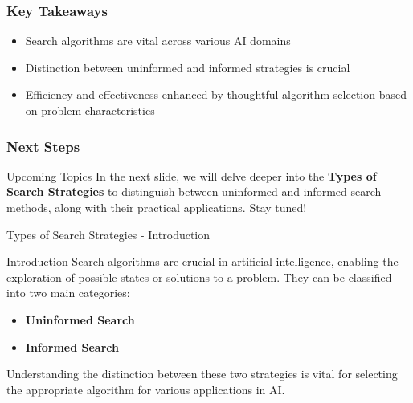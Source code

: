\documentclass[aspectratio=169]{beamer}
\begin{document}
\begin{frame}[fragile]
    \frametitle{Key Takeaways}
    \begin{itemize}
        \item Search algorithms are vital across various AI domains
        \item Distinction between uninformed and informed strategies is crucial
        \item Efficiency and effectiveness enhanced by thoughtful algorithm selection based on problem characteristics
    \end{itemize}
\end{frame}

\begin{frame}[fragile]
    \frametitle{Next Steps}
    \begin{block}{Upcoming Topics}
        In the next slide, we will delve deeper into the \textbf{Types of Search Strategies} to distinguish between uninformed and informed search methods, along with their practical applications. Stay tuned!
    \end{block}
\end{frame}

\begin{frame}[fragile]{Types of Search Strategies - Introduction}
    \begin{block}{Introduction}
        Search algorithms are crucial in artificial intelligence, enabling the exploration of possible states or solutions to a problem. They can be classified into two main categories:
        \begin{itemize}
            \item \textbf{Uninformed Search}
            \item \textbf{Informed Search}
        \end{itemize}
        Understanding the distinction between these two strategies is vital for selecting the appropriate algorithm for various applications in AI.
    \end{block}
\end{frame}
\end{document}
